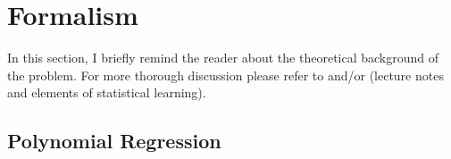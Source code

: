 \section{Formalism}
\label{sec:formalism}


In this section, I briefly remind the reader about the theoretical background of the problem. For more thorough discussion please refer to \cite{Morten} and/or \cite{Hastie} (lecture notes and elements of statistical learning).


\subsection{Polynomial Regression}

